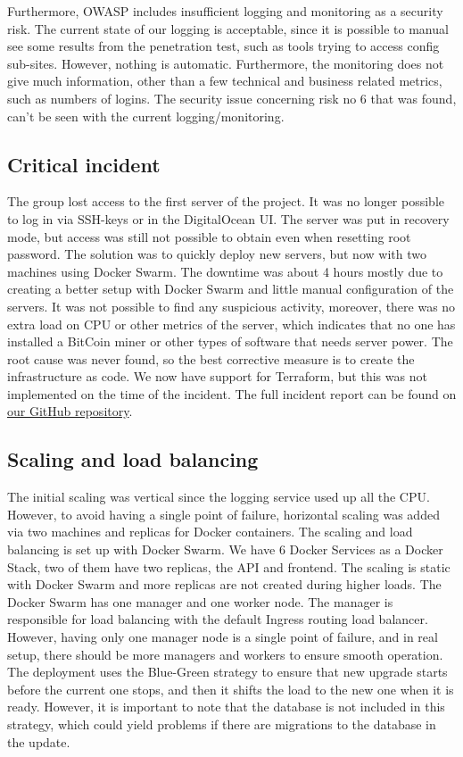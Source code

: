 \documentclass[10pt]{article}
\begin{document}
Furthermore, OWASP includes insufficient logging and monitoring as a security risk. The current state of our logging is acceptable, since it is possible to manual see some results from the penetration test, such as tools trying to access config sub-sites. However, nothing is automatic. Furthermore, the monitoring does not give much information, other than a few technical and business related metrics, such as numbers of logins. The security issue concerning risk no 6 that was found, can't be seen with the current logging/monitoring.

\subsection{Critical incident}
The group lost access to the first server of the project. It was no longer possible to log in via SSH-keys or in the DigitalOcean UI. The server was put in recovery mode, but access was still not possible to obtain even when resetting root password. The solution was to quickly deploy new servers, but now with two machines using Docker Swarm. The downtime was about 4 hours mostly due to creating a better setup with Docker Swarm and little manual configuration of the servers. It was not possible to find any suspicious activity, moreover, there was no extra load on CPU or other metrics of the server, which indicates that no one has installed a BitCoin miner or other types of software that needs server power. The root cause was never found, so the best corrective measure is to create the infrastructure as code. We now have support for Terraform, but this was not implemented on the time of the incident. The full incident report can be found on  \href{https://github.com/Arklaide/devopsITUproject/blob/main/report/sub-reports/incident_log.md}{our GitHub repository}.

\subsection{Scaling and load balancing}
The initial scaling was vertical since the logging service used up all the CPU. However, to avoid having a single point of failure, horizontal scaling was added via two machines and replicas for Docker containers.
The scaling and load balancing is set up with Docker Swarm. We have 6 Docker Services as a Docker Stack, two of them have two replicas, the API and frontend. The scaling is static with Docker Swarm and more replicas are not created during higher loads. The Docker Swarm has one manager and one worker node. The manager is responsible for load balancing with the default Ingress routing load balancer. However, having only one manager node is a single point of failure, and in real setup, there should be more managers and workers to ensure smooth operation. The deployment uses the Blue-Green strategy to ensure that new upgrade starts before the current one stops, and then it shifts the load to the new one when it is ready. However, it is important to note that the database is not included in this strategy, which could yield problems if there are migrations to the database in the update.
\end{document}
